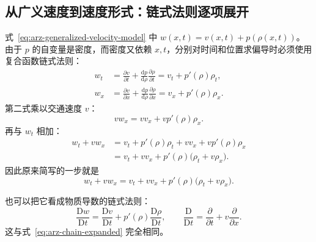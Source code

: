 \documentclass[11pt,a4paper,openany]{book}
\numberwithin{equation}{chapter}
\numberwithin{figure}{chapter}
\numberwithin{table}{chapter}
\begin{document}
\subsection{从广义速度到速度形式：链式法则逐项展开}

式~\eqref{eq:arz-generalized-velocity-model} 中
$w(x,t)=v(x,t)+p(\rho(x,t))$。由于 $p$ 的自变量是密度，而密度又依赖 $x,t$，分别对时间和位置求偏导时必须使用复合函数链式法则：
\begin{subequations}
\label{eq:arz-chain-components}
\begin{align}
w_t
&=\frac{\partial v}{\partial t}
+\frac{\mathrm dp}{\mathrm d\rho}
\frac{\partial\rho}{\partial t}
=v_t+p'(\rho)\rho_t,\\
w_x
&=\frac{\partial v}{\partial x}
+\frac{\mathrm dp}{\mathrm d\rho}
\frac{\partial\rho}{\partial x}
=v_x+p'(\rho)\rho_x.
\end{align}
\end{subequations}
第二式乘以交通速度 $v$：
\begin{equation}
vw_x=vv_x+vp'(\rho)\rho_x.
\end{equation}
再与 $w_t$ 相加：
\begin{align}
w_t+vw_x
&=v_t+p'(\rho)\rho_t+vv_x+vp'(\rho)\rho_x\\
&=v_t+vv_x+p'(\rho)\bigl(\rho_t+v\rho_x\bigr).
\label{eq:arz-chain-expanded}
\end{align}
因此原来简写的一步就是
\begin{equation}
w_t+vw_x
=v_t+vv_x+p'(\rho)\bigl(\rho_t+v\rho_x\bigr).
\label{eq:arz-material-chain}
\end{equation}

也可以把它看成物质导数的链式法则：
\begin{equation}
\frac{\mathrm Dw}{\mathrm Dt}
=\frac{\mathrm Dv}{\mathrm Dt}
+p'(\rho)\frac{\mathrm D\rho}{\mathrm Dt},
\qquad
\frac{\mathrm D}{\mathrm Dt}
=\frac{\partial}{\partial t}
+v\frac{\partial}{\partial x}.
\label{eq:arz-material-compact}
\end{equation}
这与式~\eqref{eq:arz-chain-expanded} 完全相同。
\end{document}
